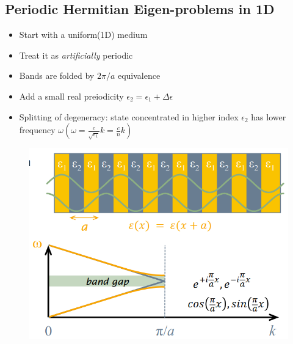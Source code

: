 \subsection{Periodic Hermitian Eigen-problems in 1D}
\begin{itemize}
    \item Start with a uniform(1D) medium
    \item Treat it as \textit{artificially} periodic
    \item Bands are folded by \(2\pi/a\) equivalence
    \item Add a small real preiodicity \(\epsilon_2 = \epsilon_1 + \Delta\epsilon\)
    \item Splitting of degeneracy: state concentrated in higher index \(\epsilon_2\) has lower frequency \(\omega\)\((\omega = \frac{c}{\sqrt{\epsilon_1}}k = \frac{c}{n}k)\)
\end{itemize}
\begin{figure}[h]
    \centering
    \includegraphics[width=\columnwidth]{images/eigenproblem.png}
    \label{fig:eigenmodel}
\end{figure}
